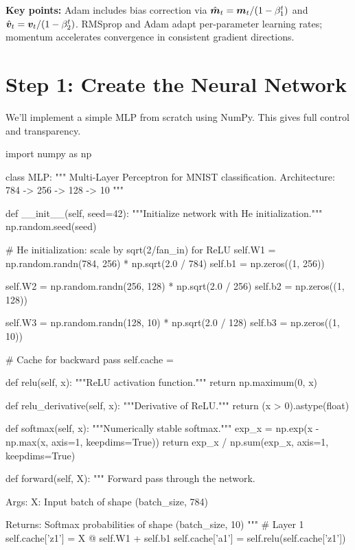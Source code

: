 \documentclass[../../main.tex]{subfiles}
\begin{document}
\noindent\textbf{Key points:} Adam includes bias correction via $\hat{\boldsymbol{m}}_t = \boldsymbol{m}_t/(1-\beta_1^t)$ and $\hat{\boldsymbol{v}}_t = \boldsymbol{v}_t/(1-\beta_2^t)$. RMSprop and Adam adapt per-parameter learning rates; momentum accelerates convergence in consistent gradient directions.

\section{Step 1: Create the Neural Network}
\label{sec:capstone-network}

We'll implement a simple MLP from scratch using NumPy. This gives full control and transparency.

\begin{pythoncode}
import numpy as np

class MLP:
    """
    Multi-Layer Perceptron for MNIST classification.
    Architecture: 784 -> 256 -> 128 -> 10
    """

    def __init__(self, seed=42):
        """Initialize network with He initialization."""
        np.random.seed(seed)

        # He initialization: scale by sqrt(2/fan_in) for ReLU
        self.W1 = np.random.randn(784, 256) * np.sqrt(2.0 / 784)
        self.b1 = np.zeros((1, 256))

        self.W2 = np.random.randn(256, 128) * np.sqrt(2.0 / 256)
        self.b2 = np.zeros((1, 128))

        self.W3 = np.random.randn(128, 10) * np.sqrt(2.0 / 128)
        self.b3 = np.zeros((1, 10))

        # Cache for backward pass
        self.cache = {}

    def relu(self, x):
        """ReLU activation function."""
        return np.maximum(0, x)

    def relu_derivative(self, x):
        """Derivative of ReLU."""
        return (x > 0).astype(float)

    def softmax(self, x):
        """Numerically stable softmax."""
        exp_x = np.exp(x - np.max(x, axis=1, keepdims=True))
        return exp_x / np.sum(exp_x, axis=1, keepdims=True)

    def forward(self, X):
        """
        Forward pass through the network.

        Args:
            X: Input batch of shape (batch_size, 784)

        Returns:
            Softmax probabilities of shape (batch_size, 10)
        """
        # Layer 1
        self.cache['z1'] = X @ self.W1 + self.b1
        self.cache['a1'] = self.relu(self.cache['z1'])


\end{pythoncode}
\end{document}
